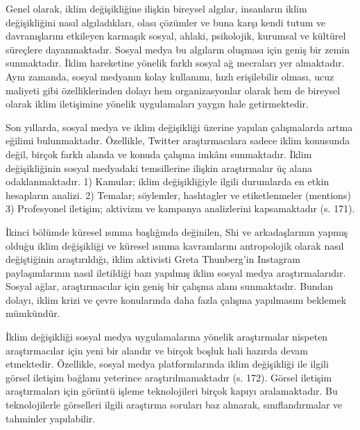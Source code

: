 \documentclass[
]{book}
\begin{document}
Genel olarak, iklim değişikliğine ilişkin bireysel algılar, insanların iklim değişikliğini nasıl algıladıkları, olası çözümler ve buna karşı kendi tutum ve davranışlarını etkileyen karmaşık sosyal, ahlaki, psikolojik, kurumsal ve kültürel süreçlere dayanmaktadır. \citep{mahl2020bit} Sosyal medya bu algıların oluşması için geniş bir zemin sunmaktadır. İklim hareketine yönelik farklı sosyal ağ mecraları yer almaktadır. Aynı zamanda, sosyal medyanın kolay kullanımı, hızlı erişilebilir olması, ucuz maliyeti gibi özelliklerinden dolayı hem organizasyonlar olarak hem de bireysel olarak iklim iletişimine yönelik uygulamaları yaygın hale getirmektedir.

Son yıllarda, sosyal medya ve iklim değişikliği üzerine yapılan çalışmalarda artma eğilimi bulunmaktadır. Özellikle, Twitter araştırmacılara sadece iklim konusunda değil, birçok farklı alanda ve konuda çalışma imkânı sunmaktadır. İklim değişikliğinin sosyal medyadaki temsillerine ilişkin araştırmalar üç alana odaklanmaktadır. \citep{pearce2019social} 1) Kamular; iklim değişikliğiyle ilgili durumlarda en etkin hesapların analizi. 2) Temalar; söylemler, hashtagler ve etiketlenmeler (mentions) 3) Profesyonel iletişim; aktivizm ve kampanya analizlerini kapsamaktadır (s. 171). \citep{hansen2020ireland}

İkinci bölümde küresel ısınma başlığında değinilen, Shi ve arkadaşlarının yapmış olduğu iklim değişikliği ve küresel ısınma kavramlarını antropolojik olarak nasıl değiştiğinin araştırıldığı, \citep{shi2020climatechange} iklim aktivisti Greta Thunberg'in Instagram paylaşımlarının nasıl iletildiği \citep{molder2021framing} bazı yapılmış iklim sosyal medya araştırmalarıdır. Sosyal ağlar, araştırmacılar için geniş bir çalışma alanı sunmaktadır. Bundan dolayı, iklim krizi ve çevre konularında daha fazla çalışma yapılmasını beklemek mümkündür.

İklim değişikliği sosyal medya uygulamalarına yönelik araştırmalar nispeten araştırmacılar için yeni bir alandır ve birçok boşluk hali hazırda devam etmektedir. Özellikle, sosyal medya platformlarında iklim değişikliği ile ilgili görsel iletişim bağlamı yeterince araştırılmamaktadır (s. 172). \citep{hansen2020ireland} Görsel iletişim araştırmaları için görüntü işleme teknolojileri birçok kapıyı aralamaktadır. Bu teknolojilerle görselleri ilgili araştırma soruları baz alınarak, sınıflandırmalar ve tahminler yapılabilir.
\end{document}
